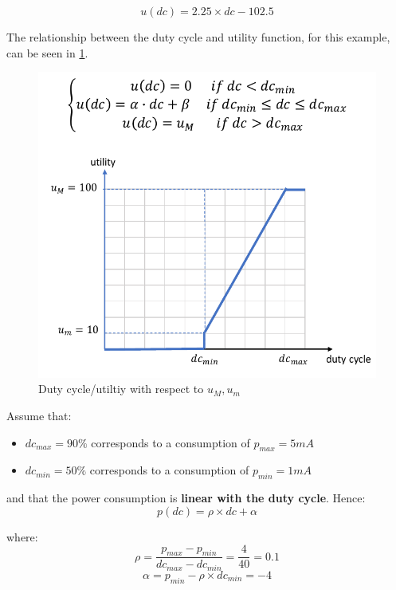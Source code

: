 \documentclass[10pt,a4paper]{report}
\theoremstyle{definition}
\begin{document}
\begin{equation}
	u(dc) = 2.25 \times dc - 102.5
\end{equation}

The relationship between the duty cycle and utility function, for this example, can be seen in \ref{utility-eg-diagram}.

	\begin{figure}[h]
	\centering\includegraphics[scale=0.50]{images/Pasted image 20230509162158.png}
	\caption{Duty cycle/utiltiy with respect to $u_{M}, u_{m}$}
	\label{utility-eg-diagram}
\end{figure}

Assume that:
\begin{itemize}
	

	\item 
	$dc_{max} = 90\%$ corresponds to a consumption of $p_{max} = 5mA$
	\item 
	$dc_{min} = 50\%$ corresponds to a consumption of $p_{min} = 1 mA$
	
\end{itemize}
and that the power consumption is \textbf{linear with the duty cycle}. Hence:
\begin{equation}
p(dc) = \rho \times dc + \alpha
\end{equation}

where:
\begin{equation}
\rho = \frac{p_{max}-p_{min}}{dc_{max}-dc_{min}} = \frac{4}{40} = 0.1
\end{equation}
\begin{equation}
\alpha = p_{min}-\rho \times dc_{min} = -4
\end{equation}
\end{document}

